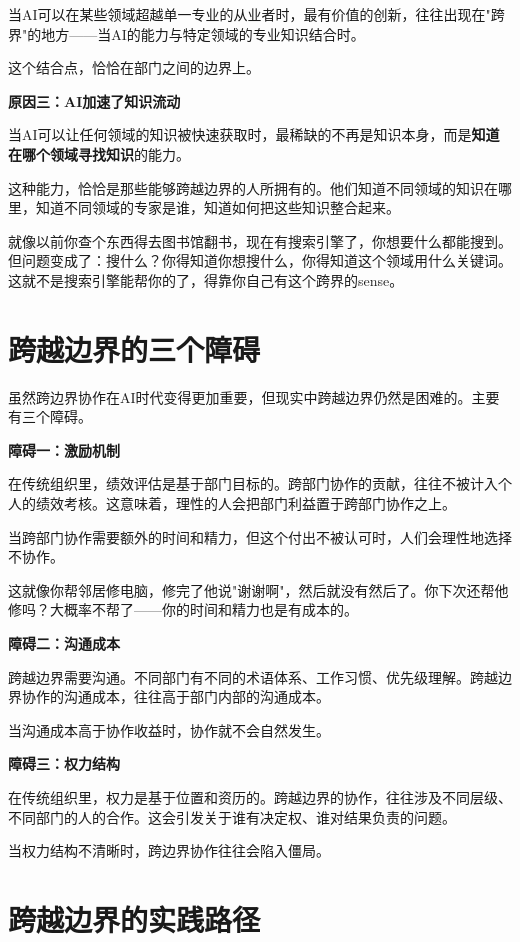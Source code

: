 当AI可以在某些领域超越单一专业的从业者时，最有价值的创新，往往出现在"跨界"的地方——当AI的能力与特定领域的专业知识结合时。

这个结合点，恰恰在部门之间的边界上。

\textbf{原因三：AI加速了知识流动}

当AI可以让任何领域的知识被快速获取时，最稀缺的不再是知识本身，而是\textbf{知道在哪个领域寻找知识}的能力。

这种能力，恰恰是那些能够跨越边界的人所拥有的。他们知道不同领域的知识在哪里，知道不同领域的专家是谁，知道如何把这些知识整合起来。

就像以前你查个东西得去图书馆翻书，现在有搜索引擎了，你想要什么都能搜到。但问题变成了：搜什么？你得知道你想搜什么，你得知道这个领域用什么关键词。这就不是搜索引擎能帮你的了，得靠你自己有这个跨界的sense。

\section{跨越边界的三个障碍}


虽然跨边界协作在AI时代变得更加重要，但现实中跨越边界仍然是困难的。主要有三个障碍。

\textbf{障碍一：激励机制}

在传统组织里，绩效评估是基于部门目标的。跨部门协作的贡献，往往不被计入个人的绩效考核。这意味着，理性的人会把部门利益置于跨部门协作之上。

当跨部门协作需要额外的时间和精力，但这个付出不被认可时，人们会理性地选择不协作。

这就像你帮邻居修电脑，修完了他说"谢谢啊"，然后就没有然后了。你下次还帮他修吗？大概率不帮了——你的时间和精力也是有成本的。

\textbf{障碍二：沟通成本}

跨越边界需要沟通。不同部门有不同的术语体系、工作习惯、优先级理解。跨越边界协作的沟通成本，往往高于部门内部的沟通成本。

当沟通成本高于协作收益时，协作就不会自然发生。

\textbf{障碍三：权力结构}

在传统组织里，权力是基于位置和资历的。跨越边界的协作，往往涉及不同层级、不同部门的人的合作。这会引发关于谁有决定权、谁对结果负责的问题。

当权力结构不清晰时，跨边界协作往往会陷入僵局。

\section{跨越边界的实践路径}


